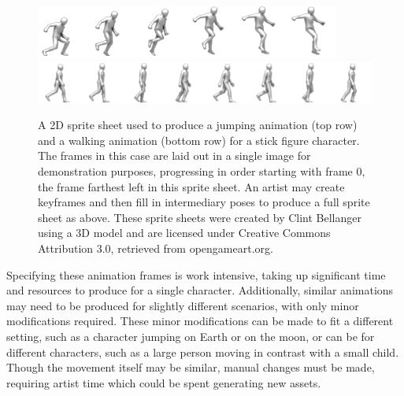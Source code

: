 \begin{figure}[htp]
    \centering
    \includegraphics[width=\textwidth]{images/sprite_example/platformer_sprites_jump.png}
    \includegraphics[width=\textwidth]{images/sprite_example/platformer_sprites_walk.png}
    \caption[Example of a 2D Sprite Animation]{A 2D sprite sheet used to produce a jumping animation (top row) and a walking animation (bottom row) for a stick figure character.  The frames in this case are laid out in a single image for demonstration purposes, progressing in order starting with frame 0, the frame farthest left in this sprite sheet.  An artist may create keyframes and then fill in intermediary poses to produce a full sprite sheet as above.  These sprite sheets were created by Clint Bellanger using a 3D model and are licensed under Creative Commons Attribution 3.0, retrieved from opengameart.org.}
    \label{fig:sprite_sheet}
\end{figure}


Specifying these animation frames is work intensive, taking up significant time and resources to produce for a single character.  Additionally, similar animations may need to be produced for slightly different scenarios, with only minor modifications required.  These minor modifications can be made to fit a different setting, such as a character jumping on Earth or on the moon, or can be for different characters, such as a large person moving in contrast with a small child.  Though the movement itself may be similar, manual changes must be made, requiring artist time which could be spent generating new assets.  

